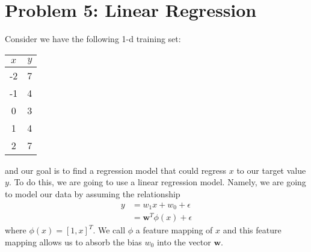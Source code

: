 \documentclass[11pt]{article}
\begin{document}
	\section*{Problem 5: Linear Regression}
		Consider we have the following 1-d training set:
		\begin{center}
			
			\begin{tabular}{|c|c|}
				\hline
				$x$ & $y$ \\
				\hline
				-2 & 7 \\
				-1 & 4 \\
				0 & 3 \\
				1 & 4 \\
				2 & 7 \\
				\hline
			\end{tabular}
		\end{center}
		and our goal is to find a regression model that could regress $x$ to our target value $y$. To do this, we are going to use a linear regression model. Namely, we are going to model our data by assuming the relationship
		\begin{align*}
		y &= w_1x + w_0 + \epsilon \\
		&= \mathbf{w}^T\phi(x) + \epsilon
		\end{align*}
		where $\phi(x) = [1, x]^T$. We call $\phi$ a feature mapping of $x$ and this feature mapping allows us to absorb the bias $w_0$ into the vector $\mathbf{w}$.
\end{document}
